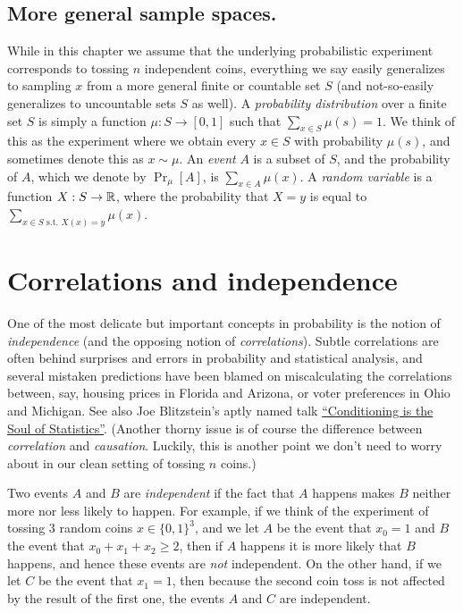 \subsection{More general sample spaces.}\label{0-More-general-sample-sp}

While in this chapter we assume that the underlying probabilistic
experiment corresponds to tossing \(n\) independent coins, everything we
say easily generalizes to sampling \(x\) from a more general finite or
countable set \(S\) (and not-so-easily generalizes to uncountable sets
\(S\) as well). A \emph{probability distribution} over a finite set
\(S\) is simply a function \(\mu : S \rightarrow [0,1]\) such that
\(\sum_{x\in S}\mu(s)=1\). We think of this as the experiment where we
obtain every \(x\in S\) with probability \(\mu(s)\), and sometimes
denote this as \(x\sim \mu\). An \emph{event} \(A\) is a subset of
\(S\), and the probability of \(A\), which we denote by \(\Pr_\mu[A]\),
is \(\sum_{x\in A} \mu(x)\). A \emph{random variable} is a function
\(X:S \rightarrow {\mathbb{R}}\), where the probability that \(X=y\) is equal to
\(\sum_{x\in S \text{ s.t. } X(x)=y} \mu(x)\).

\section{Correlations and independence}\label{0-Correlations-and-indep}

One of the most delicate but important concepts in probability is the
notion of \emph{independence} (and the opposing notion of
\emph{correlations}). Subtle correlations are often behind surprises and
errors in probability and statistical analysis, and several mistaken
predictions have been blamed on miscalculating the correlations between,
say, housing prices in Florida and Arizona, or voter preferences in Ohio
and Michigan. See also Joe Blitzstein's aptly named talk
\href{https://youtu.be/dzFf3r1yph8}{``Conditioning is the Soul of
Statistics''}. (Another thorny issue is of course the difference between
\emph{correlation} and \emph{causation}. Luckily, this is another point
we don't need to worry about in our clean setting of tossing \(n\)
coins.)

Two events \(A\) and \(B\) are \emph{independent} if the fact that \(A\)
happens makes \(B\) neither more nor less likely to happen. For example,
if we think of the experiment of tossing \(3\) random coins
\(x\in \{0,1\}^3\), and we let \(A\) be the event that \(x_0=1\) and
\(B\) the event that \(x_0 + x_1 + x_2 \geq 2\), then if \(A\) happens
it is more likely that \(B\) happens, and hence these events are
\emph{not} independent. On the other hand, if we let \(C\) be the event
that \(x_1=1\), then because the second coin toss is not affected by the
result of the first one, the events \(A\) and \(C\) are independent.

